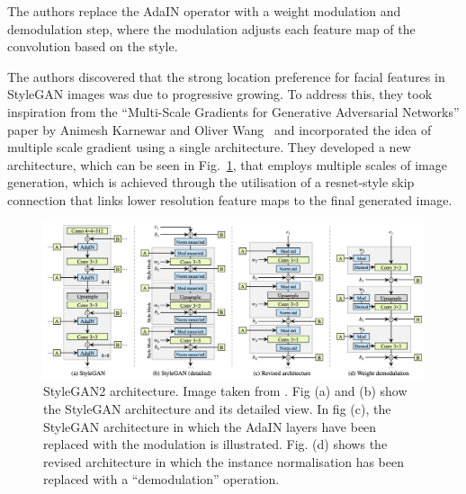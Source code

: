 \noindent The authors replace the AdaIN operator with a weight modulation and demodulation step, where the modulation adjusts each feature map of the convolution based on the style. 

\noindent The authors discovered that the strong location preference for facial features in StyleGAN images was due to progressive growing. To address this, they took inspiration from the “Multi-Scale Gradients for Generative Adversarial Networks” paper by Animesh Karnewar and Oliver Wang~\cite{karnewar2019msg} and incorporated the idea of multiple scale gradient using a single architecture. They developed a new architecture, which can be seen in Fig.~\ref{fig:StyleGAN2 architecture}, that employs multiple scales of image generation, which is achieved through the utilisation of a resnet-style skip connection that links lower resolution feature maps to the final generated image.
 \begin{figure}[htbp]
\centering
  \includegraphics[scale=0.4]{figures/StyleGAN2-architecture.png}
  \caption{StyleGAN2 architecture. Image taken from \cite{Karras2019stylegan2}. Fig (a) and (b) show the StyleGAN architecture and its detailed view. In fig (c), the StyleGAN architecture in which the AdaIN layers have been replaced with the modulation is illustrated. Fig. (d) shows the revised architecture in which the instance normalisation has been replaced with a “demodulation” operation.}
  \label{fig:StyleGAN2 architecture}
\end{figure}

